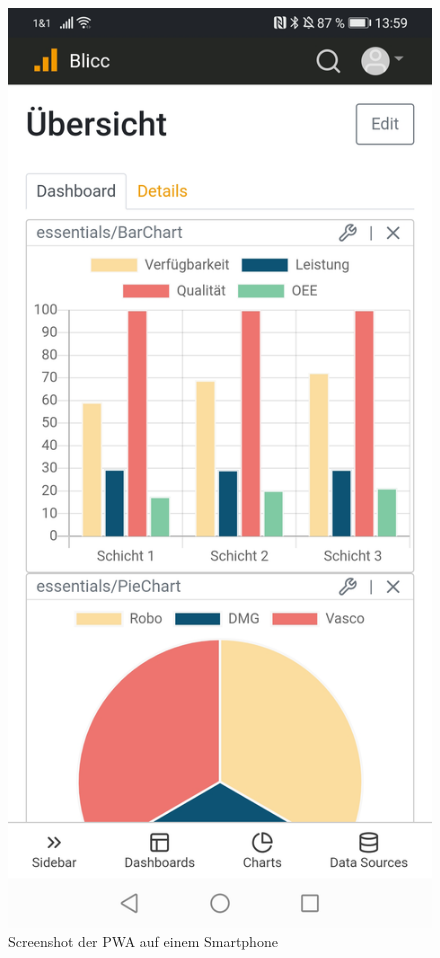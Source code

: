 \begin{figure}
    \includegraphics[scale=0.15]{img/android/Dashboard}
    \caption{Screenshot der PWA auf einem Smartphone}
\end{figure}
